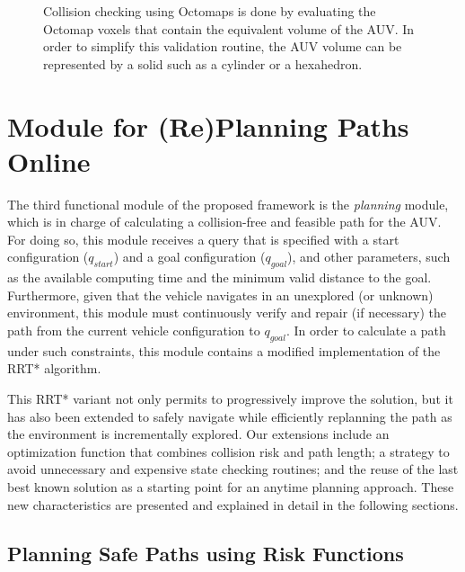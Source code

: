 \begin{figure}[htbp]
\myfloatalign
     \quad
\caption[Collision checking using Octomaps.]
{Collision checking using Octomaps is done by evaluating the Octomap voxels that
contain the equivalent volume of the AUV. In order to simplify this validation
routine, the AUV volume can be represented by a solid such as a \protect
{} cylinder or a \protect
{} hexahedron.}
\label{fig:CollisionCheck}
\end{figure}

\section{Module for (Re)Planning Paths Online}

The third functional module of the proposed framework is the \textit{planning}
module, which is in charge of calculating a collision-free and feasible path for
the \ac{AUV}. For doing so, this module receives a query that is specified with
a start configuration ($q_{start}$) and a goal configuration ($q_{goal}$), and
other parameters, such as the available computing time and the minimum valid
distance to the goal. Furthermore, given that the vehicle navigates in an
unexplored (or unknown) environment, this module must continuously verify and
repair (if necessary) the path from the current vehicle configuration to
$q_{goal}$. In order to calculate a path under such constraints, this module
contains a modified implementation of the \ac{RRT*} algorithm.

This \ac{RRT*} variant not only permits to progressively improve the solution,
but it has also been extended to safely navigate while efficiently replanning
the path as the environment is incrementally explored. Our extensions include an
optimization function that combines collision risk and path length; a strategy
to avoid unnecessary and expensive state checking routines; and the reuse of the
last best known solution as a starting point for an anytime planning approach.
These new characteristics are presented and explained in detail in the following
sections.

\subsection{Planning Safe Paths using Risk Functions}
\label{sec:RiskFunctions}

